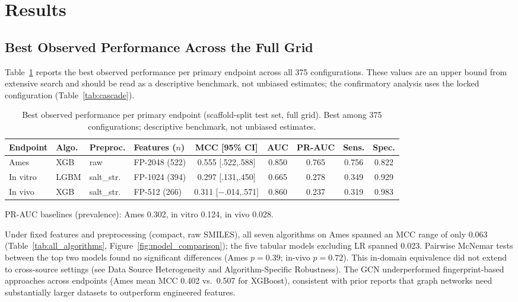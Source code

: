 \section{Results}

\subsection{Best Observed Performance Across the Full Grid}

Table~\ref{tab:best_models} reports the best observed performance per primary endpoint across all 375 configurations.
These values are an upper bound from extensive search and should be read as a descriptive benchmark, not unbiased estimates;
the confirmatory analysis uses the locked configuration (Table~\ref{tab:cascade}).

\begin{table}[ht]
\caption{Best observed performance per primary endpoint (scaffold-split test set, full grid). Best among 375 configurations; descriptive benchmark, not unbiased estimates.}
\label{tab:best_models}
\centering
\small
\begin{tabular}{@{}llllccccc@{}}
\toprule
Endpoint & Algo. & Preproc. & Features ($n$) & MCC [95\% CI] & AUC & PR-AUC & Sens. & Spec. \\
\midrule
Ames & XGB & raw & FP-2048 (522) & 0.555 [.522,.588] & 0.850 & 0.765 & 0.756 & 0.822 \\
In vitro & LGBM & salt\_str. & FP-1024 (394) & 0.297 [.131,.450] & 0.665 & 0.278 & 0.349 & 0.929 \\
In vivo & XGB & salt\_str. & FP-512 (266) & 0.311 [$-$.014,.571] & 0.860 & 0.237 & 0.319 & 0.983 \\
\bottomrule
\end{tabular}

\medskip
\footnotesize
PR-AUC baselines (prevalence): Ames 0.302, in vitro 0.124, in vivo 0.028.
\end{table}

Under fixed features and preprocessing (compact, raw SMILES), all seven algorithms on Ames spanned an MCC range of only 0.063 (Table~\ref{tab:all_algorithms}, Figure~\ref{fig:model_comparison});
the five tabular models excluding LR spanned 0.023. Pairwise McNemar tests\cite{McNemar_1947} between the top two models found no significant differences (Ames $p = 0.39$; in-vivo $p = 0.72$).
This in-domain equivalence did not extend to cross-source settings (see Data Source Heterogeneity and Algorithm-Specific Robustness). 
The GCN underperformed fingerprint-based approaches across endpoints (Ames mean MCC 0.402 vs.\ 0.507 for XGBoost),
consistent with prior reports that graph networks need substantially larger datasets to outperform engineered features.

